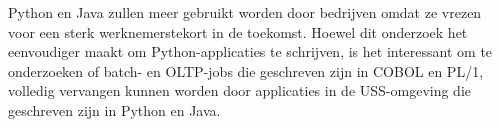 Python en Java zullen meer gebruikt worden door bedrijven omdat ze vrezen voor een sterk werknemerstekort in de toekomst. Hoewel dit onderzoek het eenvoudiger maakt om Python-applicaties te schrijven, is het interessant om te onderzoeken of batch- en OLTP-jobs die geschreven zijn in COBOL en PL/1, volledig vervangen kunnen worden door applicaties in de USS-omgeving die geschreven zijn in Python en Java. \\

